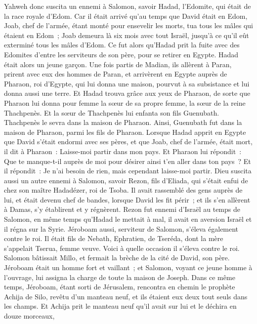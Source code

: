 \begin{multicols}{2}
Yahweh donc suscita un ennemi à Salomon, savoir Hadad, l'Edomite, qui était de la race royale d'Edom.
Car il était arrivé qu'au temps que David était en Edom, Joab, chef de l'armée, étant monté pour ensevelir les morts, tua tous les mâles qui étaient en Edom~;
Joab demeura là six mois avec tout Israël, jusqu'à ce qu'il eût exterminé tous les mâles d'Edom.
Ce fut alors qu'Hadad prit la fuite avec des Edomites d'entre les serviteurs de son père, pour se retirer en Egypte. Hadad était alors un jeune garçon.
Une fois partis de Madian, ils allèrent à Paran, prirent avec eux des hommes de Paran, et arrivèrent en Egypte auprès de Pharaon, roi d'Egypte, qui lui donna une maison, pourvut à sa subsistance et lui donna aussi une terre.
Et Hadad trouva grâce aux yeux de Pharaon, de sorte que Pharaon lui donna pour femme la sœur de sa propre femme, la sœur de la reine Thachpenès.
Et la sœur de Thachpenès lui enfanta son fils Guenubath. Thachpenès le sevra dans la maison de Pharaon. Ainsi, Guenubath fut dans la maison de Pharaon, parmi les fils de Pharaon.
Lorsque Hadad apprit en Egypte que David s'était endormi avec ses pères, et que Joab, chef de l'armée, était mort, il dit à Pharaon~: Laisse-moi partir dans mon pays.
Et Pharaon lui répondit~: Que te manque-t-il auprès de moi pour désirer ainsi t'en aller dans ton pays~? Et il répondit~: Je n'ai besoin de rien, mais cependant laisse-moi partir.
Dieu suscita aussi un autre ennemi à Salomon, savoir Rezon, fils d'Eliada, qui s'était enfui de chez son maître Hadadézer, roi de Tsoba.
Il avait rassemblé des gens auprès de lui, et était devenu chef de bandes, lorsque David les fit périr~; et ils s'en allèrent à Damas, s'y établirent et y régnèrent.
Rezon fut ennemi d'Israël au temps de Salomon, en même temps qu'Hadad le mettait à mal, il avait en aversion Israël et il régna sur la Syrie.
Jéroboam aussi, serviteur de Salomon, s'éleva également contre le roi. Il était fils de Nebath, Ephratien, de Tseréda, dont la mère s'appelait Tserua, femme veuve.
Voici à quelle occasion il s'éleva contre le roi. Salomon bâtissait Millo, et fermait la brèche de la cité de David, son père.
Jéroboam était un homme fort et vaillant~; et Salomon, voyant ce jeune homme à l'ouvrage, lui assigna la charge de toute la maison de Joseph.
Dans ce même temps, Jéroboam, étant sorti de Jérusalem, rencontra en chemin le prophète Achija de Silo, revêtu d'un manteau neuf, et ils étaient eux deux tout seuls dans les champs.
Et Achija prit le manteau neuf qu'il avait sur lui et le déchira en douze morceaux,

\end{multicols}
